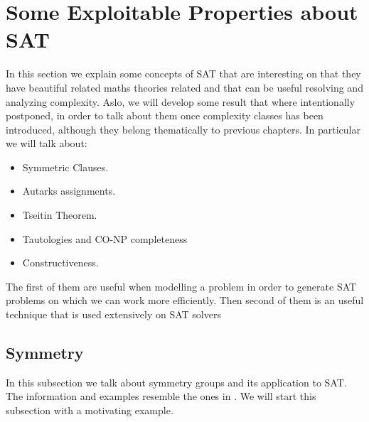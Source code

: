 
\section{Some Exploitable Properties about SAT}
In this section we explain some concepts of SAT that are interesting on that they have beautiful related maths theories related and that can be useful resolving and analyzing complexity. Aslo, we will develop some result that where intentionally postponed, in order to talk about them once complexity classes has been introduced, although they belong thematically to previous chapters. In particular we will talk about:
\begin{itemize}
\item Symmetric Clauses. 
\item Autarks assignments.
\item Tseitin Theorem.
\item Tautologies and CO-NP completeness
\item Constructiveness.
\end{itemize}

The first of them are useful when modelling a problem in order to generate SAT problems on which we can work more efficiently. Then second of them is an useful technique that is used extensively on SAT solvers



\subsection{Symmetry}

In this subsection we talk about symmetry groups and its application to SAT. The information and examples resemble the ones in \cite{sakallah2009symmetry}. We will start this subsection with a motivating example.


